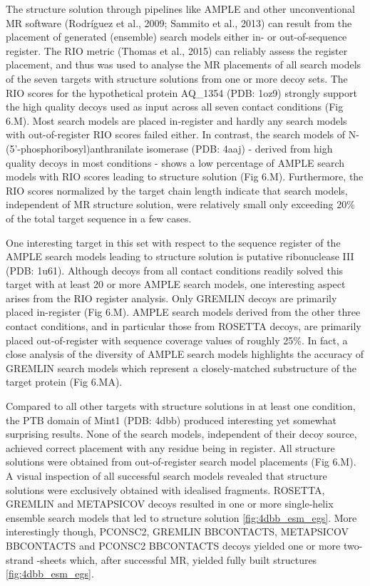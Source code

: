 The structure solution through pipelines like AMPLE and other unconventional MR software (Rodríguez et al., 2009; Sammito et al., 2013) can result from the placement of generated (ensemble) search models either in- or out-of-sequence register. The RIO metric (Thomas et al., 2015) can reliably assess the register placement, and thus was used to analyse the MR placements of all search models of the seven targets with structure solutions from one or more decoy sets. The RIO scores for the hypothetical protein AQ\_1354 (PDB: 1oz9) strongly support the high quality decoys used as input across all seven contact conditions (Fig 6.M). Most search models are placed in-register and hardly any search models with out-of-register RIO scores failed either. In contrast, the search models of N-(5’-phosphoribosyl)anthranilate isomerase (PDB: 4aaj) - derived from high quality decoys in most conditions - shows a low percentage of AMPLE search models with RIO scores leading to structure solution (Fig 6.M). Furthermore, the RIO scores normalized by the target chain length indicate that search models, independent of MR structure solution, were relatively small only exceeding 20\% of the total target sequence in a few cases. 

One interesting target in this set with respect to the sequence register of the AMPLE search models leading to structure solution is putative ribonuclease III (PDB: 1u61). Although decoys from all contact conditions readily solved this target with at least 20 or more AMPLE search models, one interesting aspect arises from the RIO register analysis. Only GREMLIN decoys are primarily placed in-register (Fig 6.M). AMPLE search models derived from the other three contact conditions, and in particular those from ROSETTA decoys, are primarily placed out-of-register with sequence coverage values of roughly 25\%. In fact, a close analysis of the diversity of AMPLE search models highlights the accuracy of GREMLIN search models which represent a closely-matched substructure of the target protein (Fig 6.MA).  

Compared to all other targets with structure solutions in at least one condition, the PTB domain of Mint1 (PDB: 4dbb) produced interesting yet somewhat surprising results. None of the search models, independent of their decoy source, achieved correct placement with any residue being in register. All structure solutions were obtained from out-of-register search model placements (Fig 6.M). A visual inspection of all successful search models revealed that structure solutions were exclusively obtained with idealised fragments. ROSETTA, GREMLIN and METAPSICOV decoys resulted in one or more single-helix ensemble search models that led to structure solution \ref{fig:4dbb_esm_egs}. More interestingly though, PCONSC2, GREMLIN BBCONTACTS, METAPSICOV BBCONTACTS and PCONSC2 BBCONTACTS decoys yielded one or more two-strand \textbeta-sheets which, after successful MR, yielded fully built structures \ref{fig:4dbb_esm_egs}.

